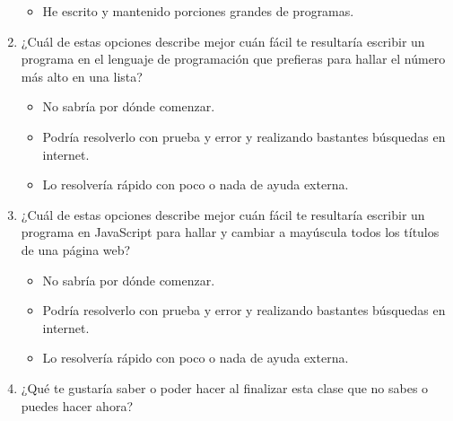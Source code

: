 \begin{enumerate}
\begin{itemize}
  \item
    He escrito y mantenido porciones grandes de programas.\\
    
  \end{itemize}

\item
  ¿Cuál de estas opciones describe mejor cuán fácil te resultaría escribir un programa
  en el lenguaje de programación que prefieras
  para hallar el número más alto en una lista?

  \begin{itemize}
    
  \item
    No sabría por dónde comenzar.
    
  \item
    Podría resolverlo con prueba y error y realizando bastantes búsquedas en internet.
    
  \item
    Lo resolvería rápido con poco o nada de ayuda externa.\\
    
  \end{itemize}

\item
  ¿Cuál de estas opciones describe mejor
  cuán fácil te resultaría escribir un programa en JavaScript
  para hallar y cambiar a mayúscula todos los títulos de una página web?

  \begin{itemize}
    
  \item
    No sabría por dónde comenzar.
    
  \item
    Podría resolverlo con prueba y error y realizando bastantes búsquedas en internet.
    
  \item
    Lo resolvería rápido con poco o nada de ayuda externa.\\
    
  \end{itemize}

\item
  ¿Qué te gustaría saber o poder hacer al finalizar esta clase
  que no sabes o puedes hacer ahora?

\end{enumerate}
